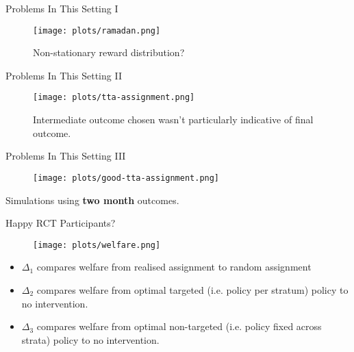 \documentclass[aspectratio=169,xcolor=dvipsnames]{beamer}
\begin{document}




\begin{frame}{Problems In This Setting I}


    \begin{figure}[htbp]
        \centering
       \texttt{[image: plots/ramadan.png]} 
        \caption{Non-stationary reward distribution?}
    \end{figure}
\end{frame}

\begin{frame}{Problems In This Setting II}

    \begin{figure}[htbp]
        \centering
       \texttt{[image: plots/tta-assignment.png]} 
       \caption{Intermediate outcome chosen wasn't particularly indicative of 
       final outcome.}
    \end{figure}
    

\end{frame}

\begin{frame}{Problems In This Setting III}

   \begin{figure}[htbp]
       \centering
      \texttt{[image: plots/good-tta-assignment.png]} 
   \end{figure} 

       Simulations using \textbf{two month} outcomes.
\end{frame}


\begin{frame}{Happy RCT Participants?}

    \begin{figure}[htbp]
        \centering
       \texttt{[image: plots/welfare.png]} 
    \end{figure}

    \begin{itemize}
        \item $\Delta_1$ compares welfare from realised assignment to random assignment
        \item $\Delta_2$ compares welfare from optimal targeted (i.e. policy per stratum) policy to no intervention.
        \item $\Delta_3$ compares welfare from optimal non-targeted (i.e. policy fixed across strata) policy to no intervention.

    \end{itemize}
\end{frame}
\end{document}
